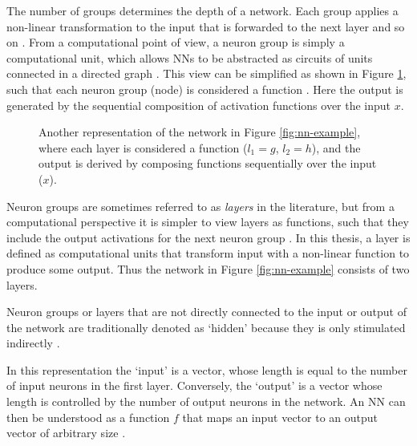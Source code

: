 \documentclass[report.tex]{subfiles}
\begin{document}
The number of groups determines the depth of
a network\cite{Russel2007}.
Each group applies a non-linear transformation to the input that is forwarded
to the next layer and so on \cite{Bishop2006, Russel2007}.
From a computational point of view, a neuron group is simply a computational
unit, which allows \glspl{NN} to be abstracted as circuits of units connected in
a directed graph
\cite{Dayan2001, Eliasmith2004, Russel2007}.
This view can be simplified as shown in Figure \ref{fig:nn-composition},
such that each neuron group (node)
is considered a function \cite{Rojas1996}.
Here the output is generated by the sequential
composition of activation functions over the input $x$.
\begin{figure}
\centering
{}
\caption{Another representation of the network in Figure
  \ref{fig:nn-example}, where each layer is considered a function ($l_1 = g$, $l_2 = h$),
and the output is derived by composing functions sequentially 
over the input ($x$).}
\label{fig:nn-composition}
\end{figure}

Neuron groups are sometimes referred to as \textit{layers} 
in the literature, but from a computational perspective it is simpler to view layers as
functions, such that they include the output activations for the next neuron group \cite{Bishop2006}.
In this thesis, a layer is defined as computational units that transform input
with a non-linear function to produce some output.
Thus the network in Figure \ref{fig:nn-example} consists of two layers.

Neuron groups or layers that are not directly connected to the input or output
of the network are traditionally denoted as `hidden' because they is only
stimulated indirectly \cite{Russel2007}.

In this representation the `input' is a vector, whose
length is equal to the number of input neurons in the first layer.
Conversely, the `output' is a vector whose length
is controlled by the number of output neurons in the network.
An \gls{NN} can then be understood as a function $f$ that 
maps an input vector to an output vector of arbitrary size
\cite{Russel2007}.
\end{document}
